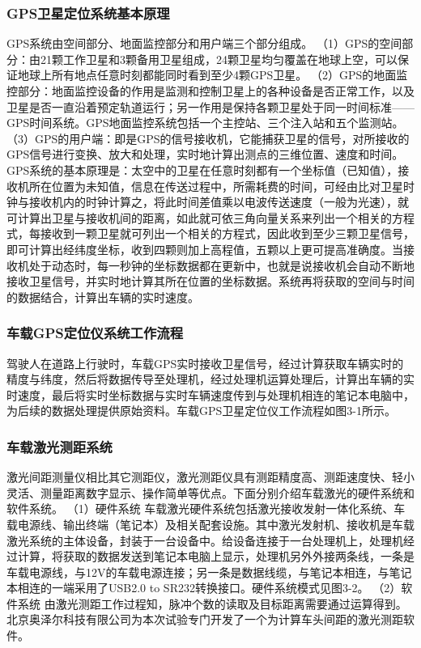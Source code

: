 \subsubsection{GPS卫星定位系统基本原理}
GPS系统由空间部分、地面监控部分和用户端三个部分组成。
（1）GPS的空间部分：由21颗工作卫星和3颗备用卫星组成，24颗卫星均匀覆盖在地球上空，可以保证地球上所有地点任意时刻都能同时看到至少4颗GPS卫星。
（2）GPS的地面监控部分：地面监控设备的作用是监测和控制卫星上的各种设备是否正常工作，以及卫星是否一直沿着预定轨道运行；另一作用是保持各颗卫星处于同一时间标准——GPS时间系统。GPS地面监控系统包括一个主控站、三个注入站和五个监测站。
（3）GPS的用户端：即是GPS的信号接收机，它能捕获卫星的信号，对所接收的GPS信号进行变换、放大和处理，实时地计算出测点的三维位置、速度和时间。
GPS系统的基本原理是：太空中的卫星在任意时刻都有一个坐标值（已知值），接收机所在位置为未知值，信息在传送过程中，所需耗费的时间，可经由比对卫星时钟与接收机内的时钟计算之，将此时间差值乘以电波传送速度（一般为光速），就可计算出卫星与接收机间的距离，如此就可依三角向量关系来列出一个相关的方程式，每接收到一颗卫星就可列出一个相关的方程式，因此收到至少三颗卫星信号，即可计算出经纬度坐标，收到四颗则加上高程值，五颗以上更可提高准确度。当接收机处于动态时，每一秒钟的坐标数据都在更新中，也就是说接收机会自动不断地接收卫星信号，并实时地计算其所在位置的坐标数据。系统再将获取的空间与时间的数据结合，计算出车辆的实时速度。

\subsubsection{车载GPS定位仪系统工作流程}
驾驶人在道路上行驶时，车载GPS实时接收卫星信号，经过计算获取车辆实时的精度与纬度，然后将数据传导至处理机，经过处理机运算处理后，计算出车辆的实时速度，最后将实时坐标数据与实时车辆速度传到与处理机相连的笔记本电脑中，为后续的数据处理提供原始资料。车载GPS卫星定位仪工作流程如图3-1所示。

\subsubsection{车载激光测距系统}
激光间距测量仪相比其它测距仪，激光测距仪具有测距精度高、测距速度快、轻小灵活、测量距离数字显示、操作简单等优点。下面分别介绍车载激光的硬件系统和软件系统。
（1）硬件系统
车载激光硬件系统包括激光接收发射一体化系统、车载电源线、输出终端（笔记本）及相关配套设施。其中激光发射机、接收机是车载激光系统的主体设备，封装于一台设备中。给设备连接于一台处理机上，处理机经过计算，将获取的数据发送到笔记本电脑上显示，处理机另外外接两条线，一条是车载电源线，与12V的车载电源连接；另一条是数据线缆，与笔记本相连，与笔记本相连的一端采用了USB2.0 to SR232转换接口。硬件系统模式见图3-2。
（2）软件系统
由激光测距工作过程知，脉冲个数的读取及目标距离需要通过运算得到。北京奥泽尔科技有限公司为本次试验专门开发了一个为计算车头间距的激光测距软件。

